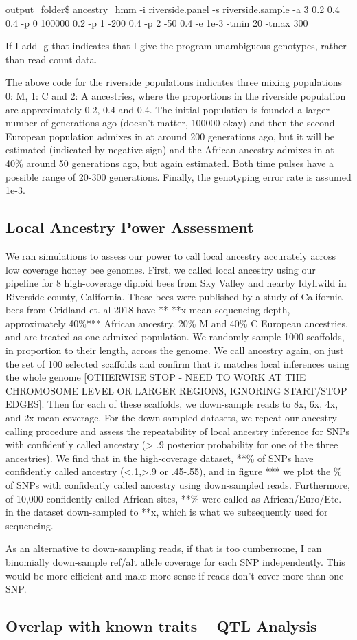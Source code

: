 \documentclass[12pt]{report}
\begin{document}
output\_folder\$ ancestry\_hmm -i riverside.panel -s riverside.sample -a 3 0.2 0.4 0.4 -p 0 100000 0.2 -p 1 -200 0.4 -p 2 -50 0.4 -e 1e-3 -tmin 20 -tmax 300 \par
If I add -g that indicates that I give the program unambiguous genotypes, rather than read count data.\par
The above code for the riverside populations indicates three mixing populations 0: M, 1: C and 2: A ancestries, where the proportions in the riverside population are approximately 0.2, 0.4 and 0.4. The initial population is founded a larger number of generations ago (doesn't matter, 100000 okay) and then the second European population admixes in at around 200 generations ago, but it will be estimated (indicated by negative sign) and the African ancestry admixes in at 40\% around 50 generations ago, but again estimated. Both time pulses have a possible range of 20-300 generations. Finally, the genotyping error rate is assumed 1e-3. \par

\subsection{Local Ancestry Power Assessment}
We ran simulations to assess our power to call local ancestry accurately across low coverage honey bee genomes. First, we called local ancestry using our pipeline for 8 high-coverage diploid bees from Sky Valley and nearby Idyllwild in Riverside county, California. These bees were published by a study of California bees from Cridland et. al 2018 have **-**x mean sequencing depth, approximately 40\%*** African ancestry, 20\% M and 40\% C European ancestries, and are treated as one admixed population. We randomly sample 1000 scaffolds, in proportion to their length, across the genome. We call ancestry again, on just the set of 100 selected scaffolds and confirm that it matches local inferences using the whole genome [OTHERWISE STOP - NEED TO WORK AT THE CHROMOSOME LEVEL OR LARGER REGIONS, IGNORING START/STOP EDGES]. Then for each of these scaffolds, we down-sample reads to 8x, 6x, 4x, and 2x mean coverage. For the down-sampled datasets, we repeat our ancestry calling procedure and assess the repeatability of local ancestry inference for SNPs with confidently called ancestry (> .9 posterior probability for one of the three ancestries). We find that in the high-coverage dataset, **\% of SNPs have confidently called ancestry (<.1,>.9 or .45-.55), and in figure *** we plot the \% of SNPs with confidently called ancestry using down-sampled reads. Furthermore, of 10,000 confidently called African sites, **\% were called as African/Euro/Etc. in the dataset down-sampled to **x, which is what we subsequently used for sequencing. \par
As an alternative to down-sampling reads, if that is too cumbersome, I can binomially down-sample ref/alt allele coverage for each SNP independently. This would be more efficient and make more sense if reads don't cover more than one SNP.

\subsection{Overlap with known traits -- QTL Analysis}
\end{document}
